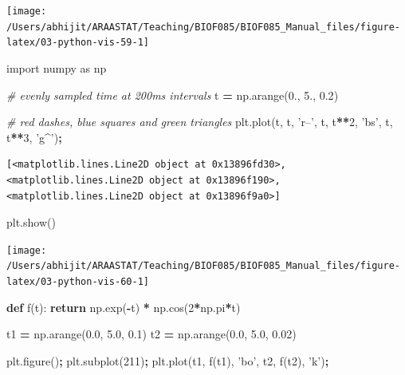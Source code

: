 \documentclass[
  letterpaper,
]{scrbook}
\newenvironment{Shaded}{\begin{snugshade}}{\end{snugshade}}
\newcommand{\CommentTok}[1]{\textcolor[rgb]{0.56,0.35,0.01}{\textit{#1}}}
\newcommand{\ControlFlowTok}[1]{\textcolor[rgb]{0.13,0.29,0.53}{\textbf{#1}}}
\newcommand{\DecValTok}[1]{\textcolor[rgb]{0.00,0.00,0.81}{#1}}
\newcommand{\FloatTok}[1]{\textcolor[rgb]{0.00,0.00,0.81}{#1}}
\newcommand{\ImportTok}[1]{#1}
\newcommand{\KeywordTok}[1]{\textcolor[rgb]{0.13,0.29,0.53}{\textbf{#1}}}
\newcommand{\NormalTok}[1]{#1}
\newcommand{\OperatorTok}[1]{\textcolor[rgb]{0.81,0.36,0.00}{\textbf{#1}}}
\newcommand{\StringTok}[1]{\textcolor[rgb]{0.31,0.60,0.02}{#1}}
\begin{document}
\begin{center}\texttt{[image: /Users/abhijit/ARAASTAT/Teaching/BIOF085/BIOF085\_Manual\_files/figure-latex/03-python-vis-59-1]} \end{center}

\begin{Shaded}
\begin{Highlighting}[]
\ImportTok{import}\NormalTok{ numpy }\ImportTok{as}\NormalTok{ np}

\CommentTok{# evenly sampled time at 200ms intervals}
\NormalTok{t }\OperatorTok{=}\NormalTok{ np.arange(}\FloatTok{0.}\NormalTok{, }\FloatTok{5.}\NormalTok{, }\FloatTok{0.2}\NormalTok{)}

\CommentTok{# red dashes, blue squares and green triangles}
\NormalTok{plt.plot(t, t, }\StringTok{'r--'}\NormalTok{, t, t}\OperatorTok{**}\DecValTok{2}\NormalTok{, }\StringTok{'bs'}\NormalTok{, t, t}\OperatorTok{**}\DecValTok{3}\NormalTok{, }\StringTok{'g^'}\NormalTok{)}\OperatorTok{;}
\end{Highlighting}
\end{Shaded}

\begin{verbatim}
[<matplotlib.lines.Line2D object at 0x13896fd30>, <matplotlib.lines.Line2D object at 0x13896f190>, <matplotlib.lines.Line2D object at 0x13896f9a0>]
\end{verbatim}

\begin{Shaded}
\begin{Highlighting}[]
\NormalTok{plt.show()}
\end{Highlighting}
\end{Shaded}

\begin{center}\texttt{[image: /Users/abhijit/ARAASTAT/Teaching/BIOF085/BIOF085\_Manual\_files/figure-latex/03-python-vis-60-1]} \end{center}

\begin{Shaded}
\begin{Highlighting}[]
\KeywordTok{def}\NormalTok{ f(t):}
    \ControlFlowTok{return}\NormalTok{ np.exp(}\OperatorTok{-}\NormalTok{t) }\OperatorTok{*}\NormalTok{ np.cos(}\DecValTok{2}\OperatorTok{*}\NormalTok{np.pi}\OperatorTok{*}\NormalTok{t)}

\NormalTok{t1 }\OperatorTok{=}\NormalTok{ np.arange(}\FloatTok{0.0}\NormalTok{, }\FloatTok{5.0}\NormalTok{, }\FloatTok{0.1}\NormalTok{)}
\NormalTok{t2 }\OperatorTok{=}\NormalTok{ np.arange(}\FloatTok{0.0}\NormalTok{, }\FloatTok{5.0}\NormalTok{, }\FloatTok{0.02}\NormalTok{)}

\NormalTok{plt.figure()}\OperatorTok{;}
\NormalTok{plt.subplot(}\DecValTok{211}\NormalTok{)}\OperatorTok{;}
\NormalTok{plt.plot(t1, f(t1), }\StringTok{'bo'}\NormalTok{, t2, f(t2), }\StringTok{'k'}\NormalTok{)}\OperatorTok{;}
\end{Highlighting}
\end{Shaded}
\end{document}
